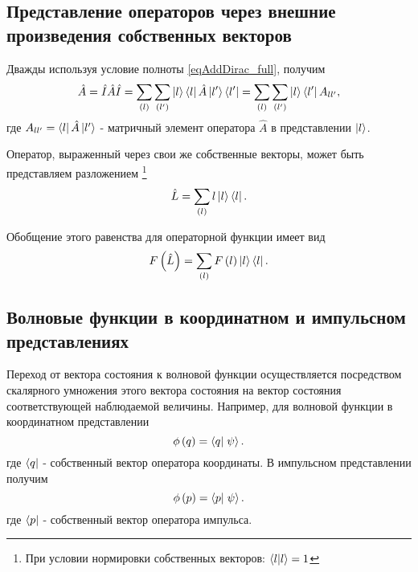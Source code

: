 \subsection{Представление  операторов  через  внешние  произведения  
собственных  векторов}
Дважды используя условие полноты \eqref{eqAddDirac_full}, получим
\begin{equation}
\hat{A} = \hat{I} \hat{A} \hat{I} = \sum_{(l)}\sum_{(l')} 
\ket{l}\bra{l} \hat{A} \ket{l'}\bra{l'} = 
\sum_{(l)}\sum_{(l')} 
\ket{l}\bra{l'} A_{ll'},
\end{equation}  
где $A_{ll'} = \bra{l} \hat{A} \ket{l'}$ - матричный
элемент оператора $\hat{A}$  в представлении  $\ket{l}$.
 
Оператор, выраженный через свои же собственные векторы, может быть
представляем разложением \footnote{При условии
 нормировки собственных векторов: $\bra{l}\ket{l} = 1$} 
\begin{equation}
\hat{L} = \sum_{(l)} 
l \ket{l}\bra{l}.
\end{equation}  

Обобщение этого равенства для операторной функции имеет вид
\begin{equation}
F\left(\hat{L}\right) = \sum_{(l)} 
F\left(l\right) \ket{l}\bra{l}.
\label{eqAddDiracFL}
\end{equation}  

\subsection{Волновые  функции  в  координатном  и  импульсном  представлениях}
Переход от вектора состояния к волновой функции осуществляется
посредством скалярного умножения этого вектора состояния на вектор
состояния соответствующей наблюдаемой величины. Например, для волновой
функции в координатном представлении 
\begin{equation}
\phi\left(q\right) = \bra{q}\left.\psi\right>.
\end{equation}  
где $\bra{q}$ - собственный вектор оператора координаты. 
В импульсном представлении получим
\begin{equation}
\phi\left(p\right) = \bra{p}\left.\psi\right>.
\end{equation}  
где $\bra{p}$ - собственный вектор оператора импульса.
